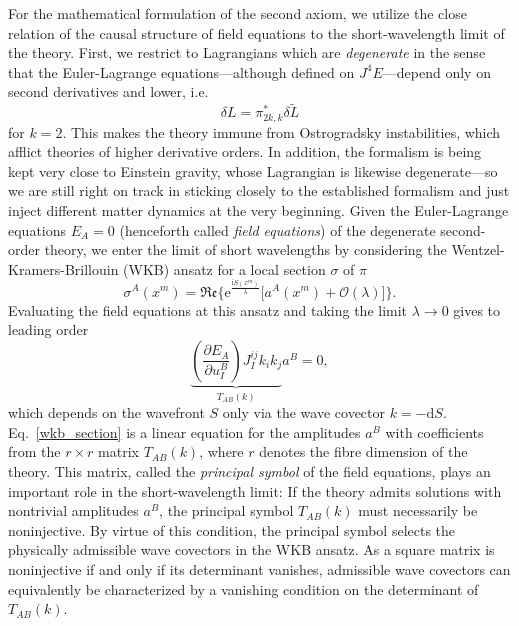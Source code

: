 For the mathematical formulation of the second axiom, we utilize the close relation of the causal structure of field equations to the short-wavelength limit of the theory. \cite{D_ll_2018} First, we restrict to Lagrangians which are \emph{degenerate} in the sense that the Euler-Lagrange equations---although defined on $J^4E$---depend only on second derivatives and lower, i.e.
\begin{equation}
  \delta L = \pi^\ast_{2k,k}\delta \tilde L
\end{equation}
for $k=2$. This makes the theory immune from Ostrogradsky instabilities\cite{Ostrogradsky_1850}, which afflict theories of higher derivative orders. In addition, the formalism is being kept very close to Einstein gravity, whose Lagrangian is likewise degenerate---so we are still right on track in sticking closely to the established formalism and just inject different matter dynamics at the very beginning. Given the Euler-Lagrange equations $E_A=0$ (henceforth called \emph{field equations}) of the degenerate second-order theory, we enter the limit of short wavelengths by considering the Wentzel-Kramers-Brillouin (WKB) ansatz for a local section $\sigma$ of $\pi$
\begin{equation}\label{wkb_ansatz}
  \sigma^A(x^m) = \mathfrak{Re}\{ \mathrm e^\frac{\mathrm iS(x^m)}{\lambda} \lbrack a^A(x^m) + \mathcal O(\lambda)\rbrack \}.
\end{equation}
Evaluating the field equations at this ansatz and taking the limit $\lambda\rightarrow 0$ gives to leading order
\begin{equation}\label{wkb_section}
  \underbrace{\left(\frac{\partial E_A}{\partial u^B_I}\right)J^{ij}_Ik_ik_j}_{T_{AB}(k)}a^B = 0,
\end{equation}
which depends on the wavefront $S$ only via the wave covector $k=-\mathrm dS$. Eq.\ \ref{wkb_section} is a linear equation for the amplitudes $a^B$ with coefficients from the $r\times r$ matrix $T_{AB}(k)$, where $r$ denotes the fibre dimension of the theory. This matrix, called the \emph{principal symbol} of the field equations, plays an important role in the short-wavelength limit: If the theory admits solutions with nontrivial amplitudes $a^B$, the principal symbol $T_{AB}(k)$ must necessarily be noninjective. By virtue of this condition, the principal symbol selects the physically admissible wave covectors in the WKB ansatz. As a square matrix is noninjective if and only if its determinant vanishes, admissible wave covectors can equivalently be characterized by a vanishing condition on the determinant of $T_{AB}(k)$.

